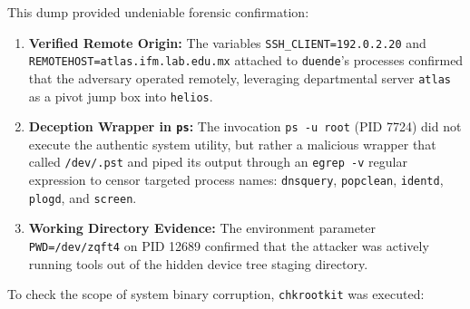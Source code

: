 This dump provided undeniable forensic confirmation:
\begin{enumerate}
    \item \textbf{Verified Remote Origin:} The variables \texttt{SSH\_CLIENT=192.0.2.20} and \texttt{REMOTEHOST=}\allowbreak\nolinkurl{atlas.ifm.lab.edu.mx} attached to \texttt{duende}'s processes confirmed that the adversary operated remotely, leveraging departmental server \texttt{atlas} as a pivot jump box into \texttt{helios}.
    \item \textbf{Deception Wrapper in \texttt{ps}:} The invocation \texttt{ps -u root} (PID 7724) did not execute the authentic system utility, but rather a malicious wrapper that called \texttt{/dev/.pst} and piped its output through an \texttt{egrep -v} regular expression to censor targeted process names: \texttt{dnsquery}, \texttt{popclean}, \texttt{identd}, \texttt{plogd}, and \texttt{screen}.
    \item \textbf{Working Directory Evidence:} The environment parameter \texttt{PWD=/dev/zqft4} on PID 12689 confirmed that the attacker was actively running tools out of the hidden device tree staging directory.
\end{enumerate}

To check the scope of system binary corruption, \texttt{chkrootkit} was executed:

\vspace{1em}

